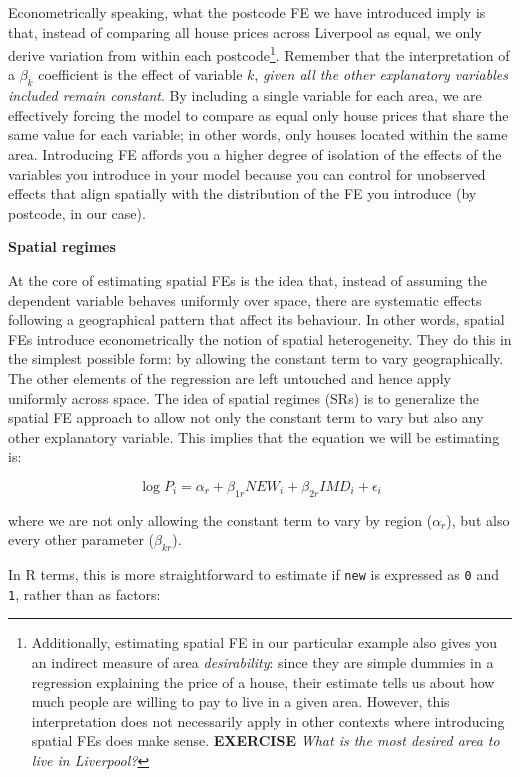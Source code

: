 \documentclass[
]{book}
\begin{document}
Econometrically speaking, what the postcode FE we have introduced imply is that, instead of comparing all house prices across Liverpool as equal, we only derive variation from within each postcode\footnote{Additionally, estimating spatial FE in our particular example also gives you an indirect measure of area \emph{desirability}: since they are simple dummies in a regression explaining the price of a house, their estimate tells us about how much people are willing to pay to live in a given area. However, this interpretation does not necessarily apply in other contexts where introducing spatial FEs does make sense. \textbf{EXERCISE} \emph{What is the most desired area to live in Liverpool?}}. Remember that the interpretation of a \(\beta_k\) coefficient is the effect of variable \(k\), \emph{given all the other explanatory variables included remain constant}. By including a single variable for each area, we are effectively forcing the model to compare as equal only house prices that share the same value for each variable; in other words, only houses located within the same area. Introducing FE affords you a higher degree of isolation of the effects of the variables you introduce in your model because you can control for unobserved effects that align spatially with the distribution of the FE you introduce (by postcode, in our case).

\textbf{Spatial regimes}

At the core of estimating spatial FEs is the idea that, instead of assuming the dependent variable behaves uniformly over space, there are systematic effects following a geographical pattern that affect its behaviour. In other words, spatial FEs introduce econometrically the notion of spatial heterogeneity. They do this in the simplest possible form: by allowing the constant term to vary geographically. The other elements of the regression are left untouched and hence apply uniformly across space. The idea of spatial regimes (SRs) is to generalize the spatial FE approach to allow not only the constant term to vary but also any other explanatory variable. This implies that the equation we will be estimating is:

\[
\log{P_i} = \alpha_r + \beta_{1r} NEW_i + \beta_{2r} IMD_i + \epsilon_i
\]

where we are not only allowing the constant term to vary by region (\(\alpha_r\)), but also every other parameter (\(\beta_{kr}\)).

In R terms, this is more straightforward to estimate if \texttt{new} is expressed as \texttt{0} and \texttt{1}, rather than as factors:
\end{document}
